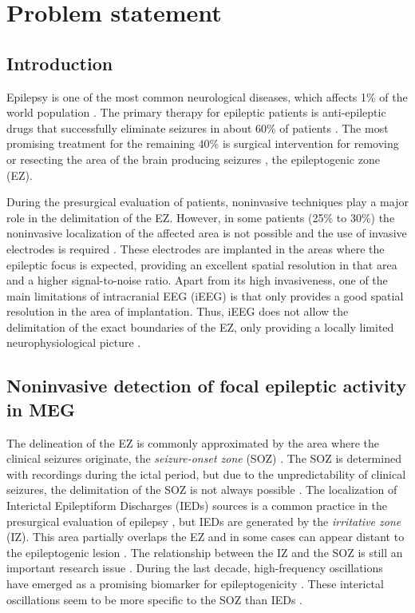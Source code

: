 \chapter{Problem statement}
	\section{Introduction}
    
    Epilepsy is one of the most common neurological diseases, which affects 1\% of the world population \citep{Ramey2013}. The primary therapy for epileptic patients is anti-epileptic drugs that successfully eliminate seizures in about 60\% of patients \citep{Franco2014}. The most promising treatment for the remaining 40\% is surgical intervention for removing or resecting the area of the brain producing seizures \citep{Jacobs2012}, the epileptogenic zone (EZ).
    
    During the presurgical evaluation of patients, noninvasive techniques play a major role in the delimitation of the EZ. However, in some patients (25\% to 30\%) the noninvasive localization of the affected area is not possible and the use of invasive electrodes is required \citep{Pittau2014}. These electrodes are implanted in the areas where the epileptic focus is expected, providing an excellent spatial resolution in that area and a higher signal-to-noise ratio. Apart from its high invasiveness, one of the main limitations of intracranial EEG (iEEG) is that only provides a good spatial resolution in the area of implantation. Thus, iEEG does not allow the delimitation of the exact boundaries of the EZ, only providing a locally limited neurophysiological picture \citep{Muthukumaraswamy2013}. 
    
    \section{Noninvasive detection of focal epileptic activity in MEG}

The delineation of the EZ is commonly approximated by the area where the clinical seizures originate, the \emph{seizure-onset zone} (SOZ) \citep{Luders2006}. The SOZ is determined with recordings during the ictal period, but due to the unpredictability of clinical seizures, the delimitation of the SOZ is not always possible \citep{Uijl2005}. The localization of Interictal Epileptiform Discharges (IEDs) sources is a common practice in the presurgical evaluation of epilepsy \citep{Nissen2016b}, but IEDs are generated by the \emph{irritative zone} (IZ). This area partially overlaps the EZ and in some cases can appear distant to the epileptogenic lesion \citep{Tamilia2017}. The relationship between the IZ and the SOZ is still an important research issue \citep{Song2015,Melani2013,Strobbe2016}. During the last decade, high-frequency oscillations have emerged as a promising biomarker for epileptogenicity \citep{Jacobs2012}. These interictal oscillations seem to be more specific to the SOZ than IEDs \citep{Jacobs2008,Crepon2010}.

